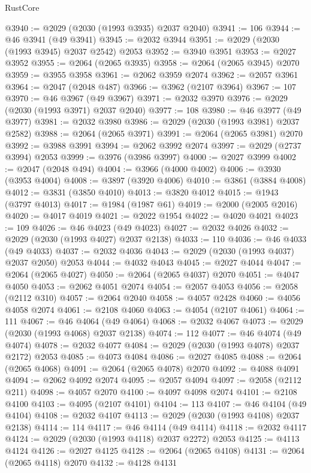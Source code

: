 \begin{lexlean}{RustCore}
\begin{coremodule}
@3940 := @2029 (@2030 (@1993 @3935) @2037 @2040)
@3941 := 106
@3944 := @46 @3941 (@49 @3941)
@3945 := @2032 @3944
@3951 := @2029 (@2030 (@1993 @3945) @2037 @2542) @2053
@3952 := @3940 @3951
@3953 := @2027 @3952
@3955 := @2064 (@2065 @3935)
@3958 := @2064 (@2065 @3945) @2070
@3959 := @3955 @3958
@3961 := @2062 @3959 @2074
@3962 := @2057 @3961
@3964 := @2047 (@2048 @487)
@3966 := @3962 (@2107 @3964)
@3967 := 107
@3970 := @46 @3967 (@49 @3967)
@3971 := @2032 @3970
@3976 := @2029 (@2030 (@1993 @3971) @2037 @2040)
@3977 := 108
@3980 := @46 @3977 (@49 @3977)
@3981 := @2032 @3980
@3986 := @2029 (@2030 (@1993 @3981) @2037 @2582)
@3988 := @2064 (@2065 @3971)
@3991 := @2064 (@2065 @3981) @2070
@3992 := @3988 @3991
@3994 := @2062 @3992 @2074
@3997 := @2029 (@2737 @3994) @2053
@3999 := @3976 (@3986 @3997)
@4000 := @2027 @3999
@4002 := @2047 (@2048 @494)
@4004 := @3966 (@4000 @4002)
@4006 := @3930 (@3953 @4004)
@4008 := @3897 (@3920 @4006)
@4010 := @3861 (@3884 @4008)
@4012 := @3831 (@3850 @4010)
@4013 := @3820 @4012
@4015 := @1943 (@3797 @4013)
@4017 := @1984 (@1987 @61)
@4019 := @2000 (@2005 @2016)
@4020 := @4017 @4019
@4021 := @2022 @1954
@4022 := @4020 @4021
@4023 := 109
@4026 := @46 @4023 (@49 @4023)
@4027 := @2032 @4026
@4032 := @2029 (@2030 (@1993 @4027) @2037 @2138)
@4033 := 110
@4036 := @46 @4033 (@49 @4033)
@4037 := @2032 @4036
@4043 := @2029 (@2030 (@1993 @4037) @2037 @2050) @2053
@4044 := @4032 @4043
@4045 := @2027 @4044
@4047 := @2064 (@2065 @4027)
@4050 := @2064 (@2065 @4037) @2070
@4051 := @4047 @4050
@4053 := @2062 @4051 @2074
@4054 := @2057 @4053
@4056 := @2058 (@2112 @310)
@4057 := @2064 @2040
@4058 := @4057 @2428
@4060 := @4056 @4058 @2074
@4061 := @2108 @4060
@4063 := @4054 (@2107 @4061)
@4064 := 111
@4067 := @46 @4064 (@49 @4064)
@4068 := @2032 @4067
@4073 := @2029 (@2030 (@1993 @4068) @2037 @2138)
@4074 := 112
@4077 := @46 @4074 (@49 @4074)
@4078 := @2032 @4077
@4084 := @2029 (@2030 (@1993 @4078) @2037 @2172) @2053
@4085 := @4073 @4084
@4086 := @2027 @4085
@4088 := @2064 (@2065 @4068)
@4091 := @2064 (@2065 @4078) @2070
@4092 := @4088 @4091
@4094 := @2062 @4092 @2074
@4095 := @2057 @4094
@4097 := @2058 (@2112 @211)
@4098 := @4057 @2070
@4100 := @4097 @4098 @2074
@4101 := @2108 @4100
@4103 := @4095 (@2107 @4101)
@4104 := 113
@4107 := @46 @4104 (@49 @4104)
@4108 := @2032 @4107
@4113 := @2029 (@2030 (@1993 @4108) @2037 @2138)
@4114 := 114
@4117 := @46 @4114 (@49 @4114)
@4118 := @2032 @4117
@4124 := @2029 (@2030 (@1993 @4118) @2037 @2272) @2053
@4125 := @4113 @4124
@4126 := @2027 @4125
@4128 := @2064 (@2065 @4108)
@4131 := @2064 (@2065 @4118) @2070
@4132 := @4128 @4131

\end{coremodule}
\end{lexlean}
